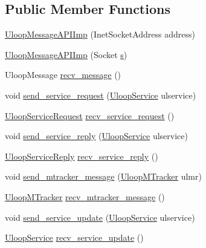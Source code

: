 \subsection*{Public Member Functions}
\begin{DoxyCompactItemize}
\item 
\hyperlink{classlib_1_1api_1_1UloopMessageAPIImp_a3838a3ff54de47d665210ec2184fc05b}{Uloop\+Message\+A\+P\+I\+Imp} (Inet\+Socket\+Address address)
\item 
\hyperlink{classlib_1_1api_1_1UloopMessageAPIImp_a48adacb111673693aa50a12f36dd7c48}{Uloop\+Message\+A\+P\+I\+Imp} (Socket \hyperlink{classlib_1_1api_1_1UloopMessageAPIImp_a9a4910679873f368a5101048d7a58697}{s})
\item 
Uloop\+Message \hyperlink{classlib_1_1api_1_1UloopMessageAPIImp_aedb5cf7280f59aa3f60447d67d8dca43}{recv\+\_\+message} ()
\item 
void \hyperlink{classlib_1_1api_1_1UloopMessageAPIImp_adc9aa0916e7369b762406eec312399c2}{send\+\_\+service\+\_\+request} (\hyperlink{classlib_1_1api_1_1UloopService}{Uloop\+Service} ulservice)
\item 
\hyperlink{classlib_1_1api_1_1UloopServiceRequest}{Uloop\+Service\+Request} \hyperlink{classlib_1_1api_1_1UloopMessageAPIImp_a918fe9df065241f3e783ac54c605301d}{recv\+\_\+service\+\_\+request} ()
\item 
void \hyperlink{classlib_1_1api_1_1UloopMessageAPIImp_a0e3433dc0fd5bb808c02e9a6a0aacd5b}{send\+\_\+service\+\_\+reply} (\hyperlink{classlib_1_1api_1_1UloopService}{Uloop\+Service} ulservice)
\item 
\hyperlink{classlib_1_1api_1_1UloopServiceReply}{Uloop\+Service\+Reply} \hyperlink{classlib_1_1api_1_1UloopMessageAPIImp_aaa61e6ce7c0251ed1fc6b0419eaf7be5}{recv\+\_\+service\+\_\+reply} ()
\item 
void \hyperlink{classlib_1_1api_1_1UloopMessageAPIImp_a589278b172d0d5c26198311faea04ff2}{send\+\_\+mtracker\+\_\+message} (\hyperlink{classlib_1_1api_1_1UloopMTracker}{Uloop\+M\+Tracker} ulmr)
\item 
\hyperlink{classlib_1_1api_1_1UloopMTracker}{Uloop\+M\+Tracker} \hyperlink{classlib_1_1api_1_1UloopMessageAPIImp_a374e184c88066fedddb8e49c55ce308c}{recv\+\_\+mtracker\+\_\+message} ()
\item 
void \hyperlink{classlib_1_1api_1_1UloopMessageAPIImp_af7ec5f2c6b544c327fb66c4e2c471dbe}{send\+\_\+service\+\_\+update} (\hyperlink{classlib_1_1api_1_1UloopService}{Uloop\+Service} ulservice)
\item 
\hyperlink{classlib_1_1api_1_1UloopService}{Uloop\+Service} \hyperlink{classlib_1_1api_1_1UloopMessageAPIImp_a42681424df55773d662182f95cbb0182}{recv\+\_\+service\+\_\+update} ()
\end{DoxyCompactItemize}
